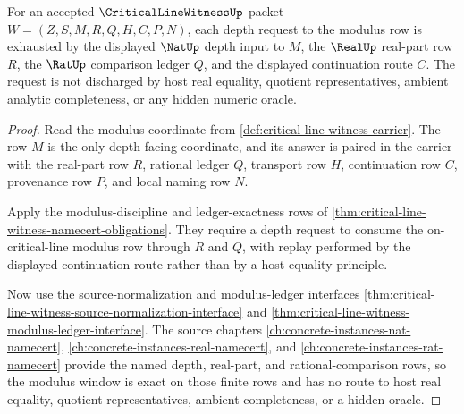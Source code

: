 \begin{theorem}
\label{thm:critical-line-witness-modulus-window-exactness}
For an accepted $\CriticalLineWitnessUp$ packet
$W=(Z,S,M,R,Q,H,C,P,N)$, each depth request to the modulus row is exhausted
by the displayed $\NatUp$ depth input to $M$, the $\RealUp$ real-part row
$R$, the $\RatUp$ comparison ledger $Q$, and the displayed continuation route
$C$. The request is not discharged by host real equality, quotient
representatives, ambient analytic completeness, or any hidden numeric oracle.
\end{theorem}
\begin{proof}
Read the modulus coordinate from
\autoref{def:critical-line-witness-carrier}. The row $M$ is the only
depth-facing coordinate, and its answer is paired in the carrier with the
real-part row $R$, rational ledger $Q$, transport row $H$, continuation row
$C$, provenance row $P$, and local naming row $N$.

Apply the modulus-discipline and ledger-exactness rows of
\autoref{thm:critical-line-witness-namecert-obligations}. They require a
depth request to consume the on-critical-line modulus row through $R$ and
$Q$, with replay performed by the displayed continuation route rather than by
a host equality principle.

Now use the source-normalization and modulus-ledger interfaces
\autoref{thm:critical-line-witness-source-normalization-interface} and
\autoref{thm:critical-line-witness-modulus-ledger-interface}. The source
chapters \autoref{ch:concrete-instances-nat-namecert},
\autoref{ch:concrete-instances-real-namecert}, and
\autoref{ch:concrete-instances-rat-namecert} provide the named depth,
real-part, and rational-comparison rows, so the modulus window is exact on
those finite rows and has no route to host real equality, quotient
representatives, ambient completeness, or a hidden oracle.
\end{proof}


